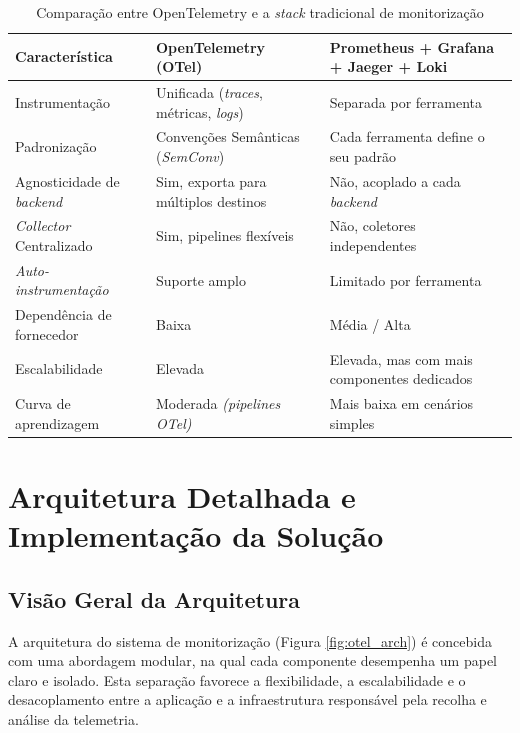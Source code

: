 \begin{table}[h!]
\centering
\caption{Comparação entre OpenTelemetry e a \textit{stack} tradicional de monitorização}
\label{tab:otel_vs_tradicional}
\begin{tabular}{|p{4cm}|p{5cm}|p{5cm}|}
\hline
\textbf{Característica} & \textbf{OpenTelemetry (OTel)} & \textbf{Prometheus + Grafana + Jaeger + Loki} \\ \hline

Instrumentação & Unificada (\textit{traces}, métricas, \textit{logs}) & Separada por ferramenta \\ \hline
Padronização & Convenções Semânticas (\textit{SemConv}) & Cada ferramenta define o seu padrão \\ \hline
Agnosticidade de \textit{backend} & Sim, exporta para múltiplos destinos & Não, acoplado a cada \textit{backend} \\ \hline
\textit{Collector} Centralizado & Sim, pipelines flexíveis & Não, coletores independentes \\ \hline
\textit{Auto-instrumentação} & Suporte amplo & Limitado por ferramenta \\ \hline
Dependência de fornecedor & Baixa & Média / Alta \\ \hline
Escalabilidade & Elevada & Elevada, mas com mais componentes dedicados \\ \hline
Curva de aprendizagem & Moderada \textit{(pipelines OTel)} & Mais baixa em cenários simples \\ \hline

\end{tabular}
\end{table}

\clearpage

\section{Arquitetura Detalhada e Implementação da Solução}

\subsection{Visão Geral da Arquitetura}

A arquitetura do sistema de monitorização (Figura \ref{fig:otel_arch}) é concebida com uma abordagem modular, na qual cada componente desempenha um papel claro e isolado. Esta separação favorece a flexibilidade, a escalabilidade e o desacoplamento entre a aplicação e a infraestrutura responsável pela recolha e análise da telemetria.


